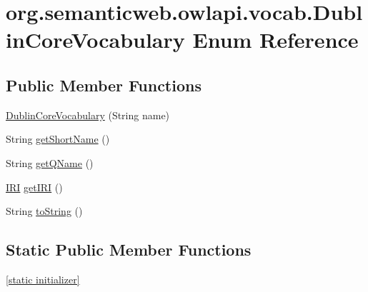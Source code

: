 \hypertarget{enumorg_1_1semanticweb_1_1owlapi_1_1vocab_1_1_dublin_core_vocabulary}{\section{org.\-semanticweb.\-owlapi.\-vocab.\-Dublin\-Core\-Vocabulary Enum Reference}
\label{enumorg_1_1semanticweb_1_1owlapi_1_1vocab_1_1_dublin_core_vocabulary}
}
\subsection*{Public Member Functions}
\begin{DoxyCompactItemize}
\item 
\hyperlink{enumorg_1_1semanticweb_1_1owlapi_1_1vocab_1_1_dublin_core_vocabulary_a6c6104928e7ff3c48fc4e595c82e9ab9}{Dublin\-Core\-Vocabulary} (String name)
\item 
String \hyperlink{enumorg_1_1semanticweb_1_1owlapi_1_1vocab_1_1_dublin_core_vocabulary_a9de6f9cd2b9b454fad3f0284e059a1c8}{get\-Short\-Name} ()
\item 
String \hyperlink{enumorg_1_1semanticweb_1_1owlapi_1_1vocab_1_1_dublin_core_vocabulary_a4bb0b8d24b9094f5b5e1efea2e840191}{get\-Q\-Name} ()
\item 
\hyperlink{classorg_1_1semanticweb_1_1owlapi_1_1model_1_1_i_r_i}{I\-R\-I} \hyperlink{enumorg_1_1semanticweb_1_1owlapi_1_1vocab_1_1_dublin_core_vocabulary_af084d918cfd7371471fff7f63e1fa250}{get\-I\-R\-I} ()
\item 
String \hyperlink{enumorg_1_1semanticweb_1_1owlapi_1_1vocab_1_1_dublin_core_vocabulary_a057de2a0c9ae96c145ac68aa37799552}{to\-String} ()
\end{DoxyCompactItemize}
\subsection*{Static Public Member Functions}
\begin{DoxyCompactItemize}
\item 
\hyperlink{enumorg_1_1semanticweb_1_1owlapi_1_1vocab_1_1_dublin_core_vocabulary_a18585007c4c71e9dc5b8ac934ad57569}{\mbox{[}static initializer\mbox{]}}
\end{DoxyCompactItemize}
